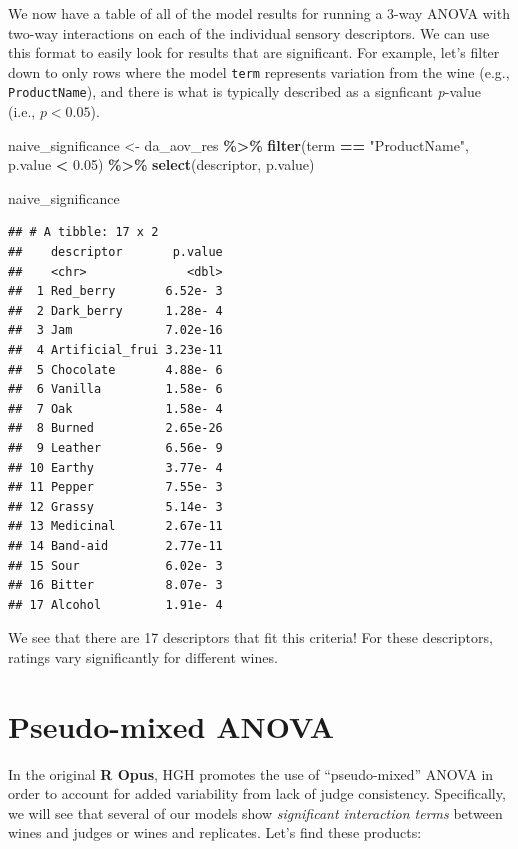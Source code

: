 \documentclass[
]{book}
\newenvironment{Shaded}{\begin{snugshade}}{\end{snugshade}}
\newcommand{\FloatTok}[1]{\textcolor[rgb]{0.00,0.00,0.81}{#1}}
\newcommand{\FunctionTok}[1]{\textcolor[rgb]{0.13,0.29,0.53}{\textbf{#1}}}
\newcommand{\NormalTok}[1]{#1}
\newcommand{\OtherTok}[1]{\textcolor[rgb]{0.56,0.35,0.01}{#1}}
\newcommand{\SpecialCharTok}[1]{\textcolor[rgb]{0.81,0.36,0.00}{\textbf{#1}}}
\newcommand{\StringTok}[1]{\textcolor[rgb]{0.31,0.60,0.02}{#1}}
\begin{document}
We now have a table of all of the model results for running a 3-way ANOVA with two-way interactions on each of the individual sensory descriptors. We can use this format to easily look for results that are significant. For example, let's filter down to only rows where the model \texttt{term} represents variation from the wine (e.g., \texttt{ProductName}), and there is what is typically described as a signficant \emph{p}-value (i.e., \(p<0.05\)).

\begin{Shaded}
\begin{Highlighting}[]
\NormalTok{naive\_significance }\OtherTok{\textless{}{-}} 
\NormalTok{  da\_aov\_res }\SpecialCharTok{\%\textgreater{}\%}
  \FunctionTok{filter}\NormalTok{(term }\SpecialCharTok{==} \StringTok{"ProductName"}\NormalTok{,}
\NormalTok{         p.value }\SpecialCharTok{\textless{}} \FloatTok{0.05}\NormalTok{) }\SpecialCharTok{\%\textgreater{}\%}
  \FunctionTok{select}\NormalTok{(descriptor, p.value)}

\NormalTok{naive\_significance}
\end{Highlighting}
\end{Shaded}

\begin{verbatim}
## # A tibble: 17 x 2
##    descriptor       p.value
##    <chr>              <dbl>
##  1 Red_berry       6.52e- 3
##  2 Dark_berry      1.28e- 4
##  3 Jam             7.02e-16
##  4 Artificial_frui 3.23e-11
##  5 Chocolate       4.88e- 6
##  6 Vanilla         1.58e- 6
##  7 Oak             1.58e- 4
##  8 Burned          2.65e-26
##  9 Leather         6.56e- 9
## 10 Earthy          3.77e- 4
## 11 Pepper          7.55e- 3
## 12 Grassy          5.14e- 3
## 13 Medicinal       2.67e-11
## 14 Band-aid        2.77e-11
## 15 Sour            6.02e- 3
## 16 Bitter          8.07e- 3
## 17 Alcohol         1.91e- 4
\end{verbatim}

We see that there are 17 descriptors that fit this criteria! For these descriptors, ratings vary significantly for different wines.

\section{Pseudo-mixed ANOVA}\label{pseudo-mixed-anova}

In the original \textbf{R Opus}, HGH promotes the use of ``pseudo-mixed'' ANOVA in order to account for added variability from lack of judge consistency. Specifically, we will see that several of our models show \emph{significant interaction terms} between wines and judges or wines and replicates. Let's find these products:
\end{document}
